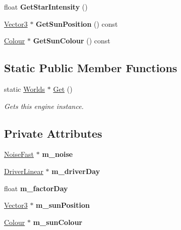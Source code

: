 \begin{DoxyCompactItemize}
float {\bfseries Get\+Star\+Intensity} ()
\item 
\mbox{\label{class_flounder_1_1_worlds_af369bc99fea8528711f07f705e6dcb8b}} 
\hyperlink{class_flounder_1_1_vector3}{Vector3} $\ast$ {\bfseries Get\+Sun\+Position} () const
\item 
\mbox{\label{class_flounder_1_1_worlds_af200ae64e9a62dd7d534eff19f345e05}} 
\hyperlink{class_flounder_1_1_colour}{Colour} $\ast$ {\bfseries Get\+Sun\+Colour} () const
\end{DoxyCompactItemize}
\subsection*{Static Public Member Functions}
\begin{DoxyCompactItemize}
\item 
static \hyperlink{class_flounder_1_1_worlds}{Worlds} $\ast$ \hyperlink{class_flounder_1_1_worlds_a389722b93c5d636192a335dccbb8f4b3}{Get} ()
\begin{DoxyCompactList}\small\item\em Gets this engine instance. \end{DoxyCompactList}\end{DoxyCompactItemize}
\subsection*{Private Attributes}
\begin{DoxyCompactItemize}
\item 
\mbox{\label{class_flounder_1_1_worlds_a6c1bdf8c4680f113f09f6eed765951d1}} 
\hyperlink{class_flounder_1_1_noise_fast}{Noise\+Fast} $\ast$ {\bfseries m\+\_\+noise}
\item 
\mbox{\label{class_flounder_1_1_worlds_a24651cd0ef804660a3051b9c2a984592}} 
\hyperlink{class_flounder_1_1_driver_linear}{Driver\+Linear} $\ast$ {\bfseries m\+\_\+driver\+Day}
\item 
\mbox{\label{class_flounder_1_1_worlds_a08574cadf75cf55af0b4893f6c64958b}} 
float {\bfseries m\+\_\+factor\+Day}
\item 
\mbox{\label{class_flounder_1_1_worlds_a8dacc7435e2ef4b5e6c3cf9e1cb4133d}} 
\hyperlink{class_flounder_1_1_vector3}{Vector3} $\ast$ {\bfseries m\+\_\+sun\+Position}
\item 
\mbox{\label{class_flounder_1_1_worlds_a5aca6c149f2811410fdf07d9e3500b55}} 
\hyperlink{class_flounder_1_1_colour}{Colour} $\ast$ {\bfseries m\+\_\+sun\+Colour}
\end{DoxyCompactItemize}


